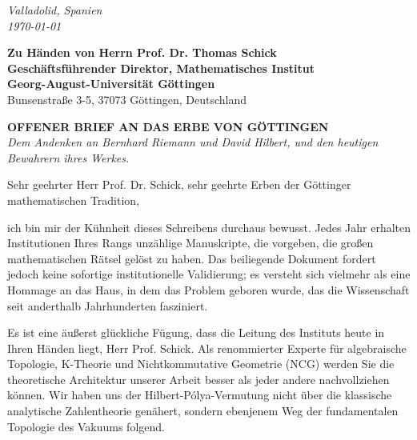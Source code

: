 \documentclass[12pt,a4paper]{article}
\begin{document}
\thispagestyle{empty}

\begin{flushright}
\textit{Valladolid, Spanien}\\
\textit{\today}
\end{flushright}

\vspace{1cm}

\noindent
\textbf{Zu Händen von Herrn Prof. Dr. Thomas Schick}\\
\textbf{Geschäftsführender Direktor, Mathematisches Institut}\\
\textbf{Georg-August-Universität Göttingen}\\
Bunsenstraße 3-5, 37073 Göttingen, Deutschland

\vspace{1cm}

\begin{center}
\Large \textbf{OFFENER BRIEF AN DAS ERBE VON GÖTTINGEN} \\
\vspace{0.2cm}
\normalsize \textit{Dem Andenken an Bernhard Riemann und David Hilbert, und den heutigen Bewahrern ihres Werkes.}
\end{center}

\vspace{0.5cm}

\noindent Sehr geehrter Herr Prof. Dr. Schick, sehr geehrte Erben der Göttinger mathematischen Tradition,

\vspace{0.3cm}

ich bin mir der Kühnheit dieses Schreibens durchaus bewusst. Jedes Jahr erhalten Institutionen Ihres Rangs unzählige Manuskripte, die vorgeben, die großen mathematischen Rätsel gelöst zu haben. Das beiliegende Dokument fordert jedoch keine sofortige institutionelle Validierung; es versteht sich vielmehr als eine Hommage an das Haus, in dem das Problem geboren wurde, das die Wissenschaft seit anderthalb Jahrhunderten fasziniert.

Es ist eine äußerst glückliche Fügung, dass die Leitung des Instituts heute in Ihren Händen liegt, Herr Prof. Schick. Als renommierter Experte für algebraische Topologie, K-Theorie und Nichtkommutative Geometrie (NCG) werden Sie die theoretische Architektur unserer Arbeit besser als jeder andere nachvollziehen können. Wir haben uns der Hilbert-Pólya-Vermutung nicht über die klassische analytische Zahlentheorie genähert, sondern ebenjenem Weg der fundamentalen Topologie des Vakuums folgend.
\end{document}
